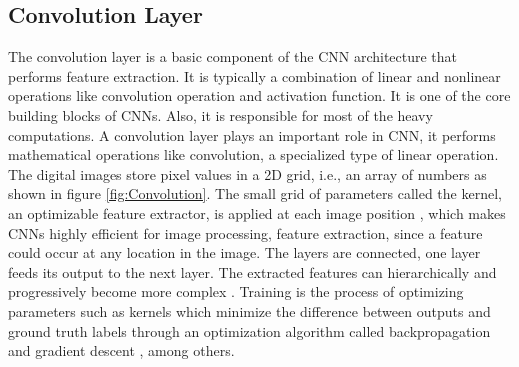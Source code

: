 \subsection{Convolution Layer}
The convolution layer is a basic component of the \ac{CNN} architecture that performs feature extraction. It is typically a combination of linear and nonlinear operations like convolution operation and activation function. It is one of the core building blocks of \acp{CNN}. Also, it is responsible for most of the heavy computations. A convolution layer plays an important role in \ac{CNN}, it performs mathematical operations like convolution, a specialized type of linear operation. The digital images store pixel values in a \ac{2D} grid, i.e., an array of numbers as shown in figure \ref{fig:Convolution}. The small grid of parameters called the kernel, an optimizable feature extractor, is applied at each image position \cite{articleCNNs}, which makes \acp{CNN} highly efficient for image processing, feature extraction, since a feature could occur at any location in the image. The layers are connected, one layer feeds its output to the next layer. The extracted features can hierarchically and progressively become more complex \cite{articleCNNs}. Training is the process of optimizing parameters such as kernels which minimize the difference between outputs and ground truth labels through an optimization algorithm called backpropagation \cite{Goodfellow-et-al-2016} and gradient descent \cite{ruder2017overview}, among others. 

